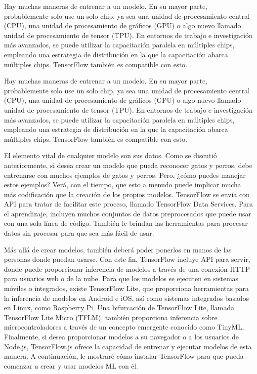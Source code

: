 Hay muchas maneras de entrenar a un modelo. En su mayor parte, probablemente solo use un solo chip, ya sea una unidad de procesamiento central (CPU), una unidad de procesamiento de gráficos (GPU) o algo nuevo llamado unidad de procesamiento de tensor (TPU). En entornos de trabajo e investigación más avanzados, se puede utilizar la capacitación paralela en múltiples chips, empleando una estrategia de distribución en la que la capacitación abarca múltiples chips. TensorFlow también es compatible con esto.

Hay muchas maneras de entrenar a un modelo. En su mayor parte, probablemente solo use un solo chip, ya sea una unidad de procesamiento central (CPU), una unidad de procesamiento de gráficos (GPU) o algo nuevo llamado unidad de procesamiento de tensor (TPU). En entornos de trabajo e investigación más avanzados, se puede utilizar la capacitación paralela en múltiples chips, empleando una estrategia de distribución en la que la capacitación abarca múltiples chips. TensorFlow también es compatible con esto.

El elemento vital de cualquier modelo son sus datos. Como se discutió anteriormente, si desea crear un modelo que pueda reconocer gatos y perros, debe entrenarse con muchos ejemplos de gatos y perros. Pero, ¿cómo puedes manejar estos ejemplos? Verá, con el tiempo, que esto a menudo puede implicar mucha más codificación que la creación de los propios modelos. TensorFlow se envía con API para tratar de facilitar este proceso, llamado TensorFlow Data Services. Para el aprendizaje, incluyen muchos conjuntos de datos preprocesados que puede usar con una sola línea de código. También le brindan las herramientas para procesar datos sin procesar para que sea más fácil de usar.

Más allá de crear modelos, también deberá poder ponerlos en manos de las personas donde puedan usarse. Con este fin, TensorFlow incluye API para servir, donde puede proporcionar inferencia de modelos a través de una conexión HTTP para usuarios web o de la nube. Para que los modelos se ejecuten en sistemas móviles o integrados, existe TensorFlow Lite, que proporciona herramientas para la inferencia de modelos en Android e iOS, así como sistemas integrados basados en Linux, como Raspberry Pi. Una bifurcación de TensorFlow Lite, llamada TensorFlow Lite Micro (TFLM), también proporciona inferencia sobre microcontroladores a través de un concepto emergente conocido como TinyML. Finalmente, si desea proporcionar modelos a su navegador o a los usuarios de Node.js, TensorFlow.js ofrece la capacidad de entrenar y ejecutar modelos de esta manera. A continuación, le mostraré cómo instalar TensorFlow para que pueda comenzar a crear y usar modelos ML con él.

